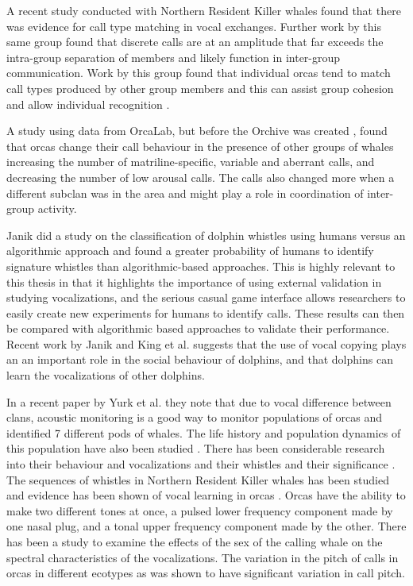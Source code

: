\documentclass[12pt,oneside]{book}
\begin{document}
A recent study \cite{miller2004matching} conducted with Northern
Resident Killer whales found that there was evidence for call type
matching in vocal exchanges.  Further work by this same group
\cite{miller2006diversity} found that discrete calls are at an
amplitude that far exceeds the intra-group separation of members and
likely function in inter-group communication.  Work by this group
found that individual orcas tend to match call types produced by other
group members \cite{miller2004matching} and this can assist group
cohesion \cite{miller2002mixed} and allow individual recognition
\cite{miller2007caller}.

A study using data from OrcaLab, but before the Orchive was created
\cite{weiss2006vocal}, found that orcas change their call behaviour in
the presence of other groups of whales increasing the number of
matriline-specific, variable and aberrant calls, and decreasing the
number of low arousal calls.  The calls also changed more when a
different subclan was in the area and might play a role in
coordination of inter-group activity.

Janik \cite{janik1999pitfalls} did a study on the classification of
dolphin whistles using humans versus an algorithmic approach and found
a greater probability of humans to identify signature whistles than
algorithmic-based approaches.  This is highly relevant to this thesis
in that it highlights the importance of using external validation in
studying vocalizations, and the serious casual game interface allows
researchers to easily create new experiments for humans to identify
calls.  These results can then be compared with algorithmic based
approaches to validate their performance.  Recent work by Janik and
King et al. \cite{king2013copying} suggests that the use of vocal
copying plays an an important role in the social behaviour of dolphins,
and that dolphins can learn the vocalizations of other dolphins.

In a recent paper by Yurk et al. \cite{yurk2010sequential} they note
that due to vocal difference between clans, acoustic monitoring is a
good way to monitor populations of orcas \cite{barretlennardphd} and
identified 7 different pods of whales.  The life history and
population dynamics of this population have also been studied
\cite{olesiuk1990life}.  There has been considerable research into
their behaviour and vocalizations \cite{thomsen1999orca} and their
whistles \cite{thomsen2001whistles} and their significance
\cite{thomsen2002significance}.  The sequences of whistles in Northern
Resident Killer whales has been studied \cite{riesch2008sequences} and
evidence has been shown of vocal learning in orcas
\cite{deecke2000dialect}.  Orcas have the ability to make two
different tones at once, a pulsed lower frequency component made by
one nasal plug, and a tonal upper frequency component made by the
other.  There has been a study to examine the effects of the sex of
the calling whale on the spectral characteristics \cite{miller07sex}
of the vocalizations.  The variation in the pitch of calls in orcas in
different ecotypes as was shown to have \cite{foote2008variation}
significant variation in call pitch.
\end{document}
